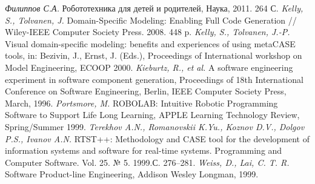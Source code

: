 \documentclass[a4, 12pt]{article}
\begin{document}
\begin{thebibliography}{9001}
 \emph{Филиппов С.А.} Робототехника для детей и родителей, Наука, 2011. 264 С.
 \emph{Kelly, S., Tolvanen, J.} Domain-Specific Modeling: Enabling Full Code Generation // Wiley-IEEE Computer Society Press. 2008. 448 p.
 \emph{Kelly, S., Tolvanen, J.-P.} Visual domain-specific modeling: benefits and experiences of using metaCASE tools, in: Bezivin, J., Ernst, J. (Eds.), Proceedings of International workshop on Model Engineering, ECOOP 2000.
 \emph{Kieburtz, R., et al.} A software engineering experiment in software component generation, Proceedings of 18th International Conference on Software Engineering, Berlin, IEEE Computer Society Press, March, 1996.
 \emph{Portsmore, M.} ROBOLAB: Intuitive Robotic Programming Software to Support Life Long Learning, APPLE Learning Technology Review, Spring/Summer 1999.
 \emph{Terekhov A.N., Romanovskii K.Yu., Koznov D.V., Dolgov P.S., Ivanov A.N.} RTST++: Methodology and CASE tool for the development of information systems and software for real-time systems. Programming and Computer Software. Vol. 25. № 5. 1999.С. 276--281.
 \emph{Weiss, D., Lai, C. T. R.} Software Product-line Engineering, Addison Wesley Longman, 1999.
\end{thebibliography}
\end{document}
